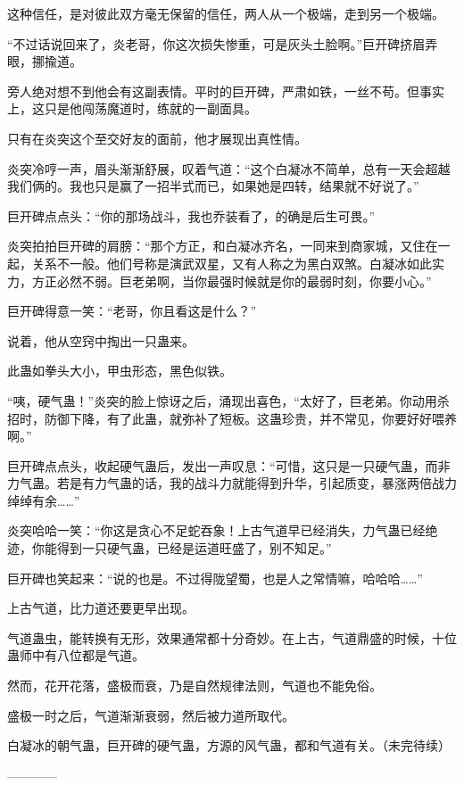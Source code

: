 \begin{this_body}
这种信任，是对彼此双方毫无保留的信任，两人从一个极端，走到另一个极端。

“不过话说回来了，炎老哥，你这次损失惨重，可是灰头土脸啊。”巨开碑挤眉弄眼，挪揄道。

旁人绝对想不到他会有这副表情。平时的巨开碑，严肃如铁，一丝不苟。但事实上，这只是他闯荡魔道时，练就的一副面具。

只有在炎突这个至交好友的面前，他才展现出真性情。

炎突冷哼一声，眉头渐渐舒展，叹着气道：“这个白凝冰不简单，总有一天会超越我们俩的。我也只是赢了一招半式而已，如果她是四转，结果就不好说了。”

巨开碑点点头：“你的那场战斗，我也乔装看了，的确是后生可畏。”

炎突拍拍巨开碑的肩膀：“那个方正，和白凝冰齐名，一同来到商家城，又住在一起，关系不一般。他们号称是演武双星，又有人称之为黑白双煞。白凝冰如此实力，方正必然不弱。巨老弟啊，当你最强时候就是你的最弱时刻，你要小心。”

巨开碑得意一笑：“老哥，你且看这是什么？”

说着，他从空窍中掏出一只蛊来。

此蛊如拳头大小，甲虫形态，黑色似铁。

“咦，硬气蛊！”炎突的脸上惊讶之后，涌现出喜色，“太好了，巨老弟。你动用杀招时，防御下降，有了此蛊，就弥补了短板。这蛊珍贵，并不常见，你要好好喂养啊。”

巨开碑点点头，收起硬气蛊后，发出一声叹息：“可惜，这只是一只硬气蛊，而非力气蛊。若是有力气蛊的话，我的战斗力就能得到升华，引起质变，暴涨两倍战力绰绰有余……”

炎突哈哈一笑：“你这是贪心不足蛇吞象！上古气道早已经消失，力气蛊已经绝迹，你能得到一只硬气蛊，已经是运道旺盛了，别不知足。”

巨开碑也笑起来：“说的也是。不过得陇望蜀，也是人之常情嘛，哈哈哈……”

上古气道，比力道还要更早出现。

气道蛊虫，能转换有无形，效果通常都十分奇妙。在上古，气道鼎盛的时候，十位蛊师中有八位都是气道。

然而，花开花落，盛极而衰，乃是自然规律法则，气道也不能免俗。

盛极一时之后，气道渐渐衰弱，然后被力道所取代。

白凝冰的朝气蛊，巨开碑的硬气蛊，方源的风气蛊，都和气道有关。（未完待续）

------------

\end{this_body}

